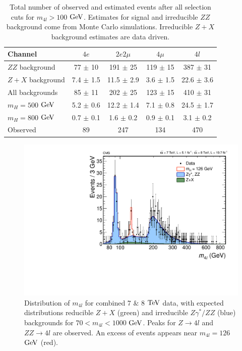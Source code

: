 \begin{table}[htbp]
\begin{center}
\begin{tabular}{l|c|c|c|c}
\hline \hline
      Channel         & $4e$ & $2e2\mu$ & $4\mu$ & $4l$  \\
      \hline
      $ZZ$ background  & 77  $\pm$ 10    &  191  $\pm$  25  & 119  $\pm$  15     &  387  $\pm$ 31\\
      $Z + X$  background & 7.4 $\pm$ 1.5   & 11.5  $\pm$ 2.9  & 3.6  $\pm$ 1.5     &  22.6 $\pm$ 3.6  \\
      \hline
      All backgrounds        & 85 $\pm$ 11     & 202  $\pm$ 25    &  123  $\pm$ 15     &  410 $\pm$ 31 \\
      \hline
      $m_H =  500$ $\rm{GeV}$ &  5.2  $\pm$  0.6  & 12.2  $\pm$  1.4 &   7.1  $\pm$  0.8  &  24.5 $\pm$ 1.7  \\
      $m_H =  800$ $\rm{GeV}$ &  0.7  $\pm$  0.1  &  1.6  $\pm$  0.2 &   0.9  $\pm$  0.1  &  3.1  $\pm$ 0.2 \\
      \hline
      Observed  & 89 & 247 & 134 & 470\\
\hline \hline
\end{tabular}
\caption[Number of Observed $4l$ Events in $100 < m_{4l} < 1000$ $\rm{GeV}$]{Total number of observed and estimated events after all selection cuts for $m_{4l} > 100$ $\rm{GeV}$. Estimates for signal and irreducible $ZZ$ background come from Monte Carlo simulations. Irreducible $Z+X$ background estimates are data driven.
\label{tbl:ZZ4lEventsFullRange}}
\end{center}
\end{table}

\begin{figure}[htbp]
\begin{center}
\includegraphics[width=.7\linewidth]{HiggsDiscovery/figures/ZZMass_7Plus8TeV_70-1000_3GeV.pdf}
\caption[$m_{4l}$ Distributions of $4l$ Events]{Distribution of $m_{4l}$ for combined $7$  $\&$ $8$ $\rm{TeV}$ data, with expected distributions reducible $Z+X$ (green) and irreducible $Z\gamma^{*}/ZZ$ (blue) backgrounds for $70< m_{4l} < 1000$ $\rm{GeV}$. Peaks for $Z\rightarrow 4l$ and $ZZ\rightarrow 4l$ are observed. An excess of events appears near $m_{4l} = 126$ $\rm{GeV}$ (red).}
\label{fig:m4lPlot}
\end{center}
\end{figure}

